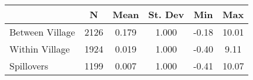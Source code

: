\begin{tabular}{l*{5}{c}}\hline&\multicolumn{1}{c}{N}&\multicolumn{1}{c}{Mean}&\multicolumn{1}{c}{St. Dev}&\multicolumn{1}{c}{Min}&\multicolumn{1}{c}{Max}\\ \hline 
Between Village & 2126 & 0.179 & 1.000 & -0.18 & 10.01 \\
Within Village & 1924 & 0.019 & 1.000 & -0.40 & 9.11 \\
Spillovers & 1199 & 0.007 & 1.000 & -0.41 & 10.07 \\
\hline \end{tabular}
